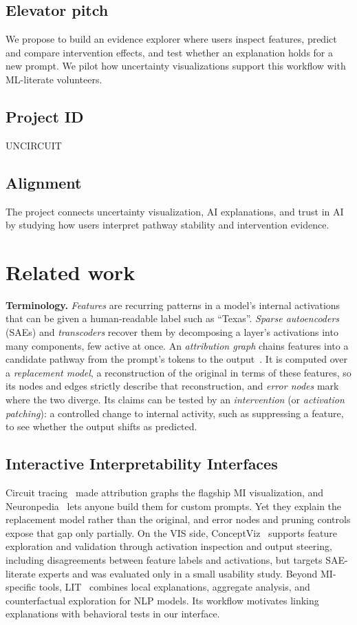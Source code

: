 \documentclass[sigconf,balance=false]{acmart}
\begin{document}
\subsection{Elevator pitch}
We propose to build an evidence explorer where users inspect features, predict and compare intervention effects, and test whether an explanation holds for a new prompt. We pilot how uncertainty visualizations support this workflow with ML-literate volunteers.

\subsection{Project ID}
UNCIRCUIT

\subsection{Alignment}
The project connects uncertainty visualization, AI explanations, and trust in AI by studying how users interpret pathway stability and intervention evidence.

\section{Related work}

\label{sec:background}
\textbf{Terminology.} \emph{Features} are recurring patterns in a model's internal activations that can be given a human-readable label such as ``Texas''. \emph{Sparse autoencoders} (SAEs) and \emph{transcoders} recover them by decomposing a layer's activations into many components, few active at once. An \emph{attribution graph} chains features into a candidate pathway from the prompt's tokens to the output~\cite{ameisen2025circuit}. It is computed over a \emph{replacement model}, a reconstruction of the original in terms of these features, so its nodes and edges strictly describe that reconstruction, and \emph{error nodes} mark where the two diverge. Its claims can be tested by an \emph{intervention} (or \emph{activation patching}): a controlled change to internal activity, such as suppressing a feature, to see whether the output shifts as predicted.

\subsection{Interactive Interpretability Interfaces}
Circuit tracing~\cite{ameisen2025circuit} made attribution graphs the flagship MI visualization, and Neuronpedia~\cite{lin2023neuronpedia} lets anyone build them for custom prompts. Yet they explain the replacement model rather than the original, and error nodes and pruning controls expose that gap only partially. On the VIS side, ConceptViz~\cite{li2025conceptviz}
supports feature exploration and validation through activation inspection and output steering, including disagreements between feature labels and activations, but targets SAE-literate experts and was evaluated only in a small usability study. Beyond MI-specific tools, LIT~\cite{tenney2020lit} combines local explanations, aggregate analysis, and counterfactual exploration for NLP models. Its workflow motivates linking explanations with behavioral tests in our interface.
\end{document}
